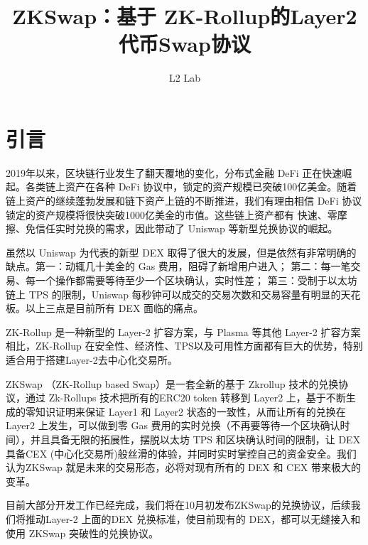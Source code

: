 \documentclass[]{template/llncs}
\begin{document}

\pagestyle{plain}

%
\title{ZKSwap：基于 ZK-Rollup的Layer2 代币Swap协议}

\author{L2 Lab}


\maketitle

%
\section{引言}

2019年以来，区块链行业发生了翻天覆地的变化，分布式金融 DeFi 正在快速崛起。各类链上资产在各种 DeFi 协议中，锁定的资产规模已突破100亿美金。随着链上资产的继续蓬勃发展和链下资产上链的不断推进，我们有理由相信 DeFi 协议锁定的资产规模将很快突破1000亿美金的市值。这些链上资产都有 快速、零摩擦、免信任实时兑换的需求，因此带动了 Uniswap \cite{uniswapofficial} 等新型兑换协议的崛起。

虽然以 Uniswap 为代表的新型 DEX 取得了很大的发展，但是依然有非常明确的缺点。第一：动辄几十美金的 Gas 费用，阻碍了新增用户进入；  第二：每一笔交易、每一个操作都需要等待至少一个区块确认，实时性差； 第三：受制于以太坊链上 TPS 的限制，Uniswap 每秒钟可以成交的交易次数和交易容量有明显的天花板。以上三点是目前所有 DEX 面临的痛点。

ZK-Rollup \cite{zkrollups} 是一种新型的 Layer-2 扩容方案，与 Plasma 等其他 Layer-2 扩容方案相比，ZK-Rollup 在安全性、经济性、TPS以及可用性方面都有巨大的优势，特别适合用于搭建Layer-2去中心化交易所。

ZKSwap （ZK-Rollup based Swap）是一套全新的基于 Zkrollup 技术的兑换协议，通过 Zk-Rollups 技术把所有的ERC20 token 转移到 Layer2 上，基于不断生成的零知识证明来保证 Layer1 和 Layer2 状态的一致性，从而让所有的兑换在 Layer2 上发生，可以做到零 Gas 费用的实时兑换（不再要等待一个区块确认时间），并且具备无限的拓展性，摆脱以太坊 TPS 和区块确认时间的限制，让 DEX 具备CEX (中心化交易所)般丝滑的体验，并同时实时掌控自己的资金安全。我们认为ZKSwap 就是未来的交易形态，必将对现有所有的 DEX 和 CEX 带来极大的变革。

目前大部分开发工作已经完成，我们将在10月初发布ZKSwap的兑换协议，后续我们将推动Layer-2 上面的DEX 兑换标准，使目前现有的 DEX，都可以无缝接入和使用 ZKSwap 突破性的兑换协议。
\end{document}
